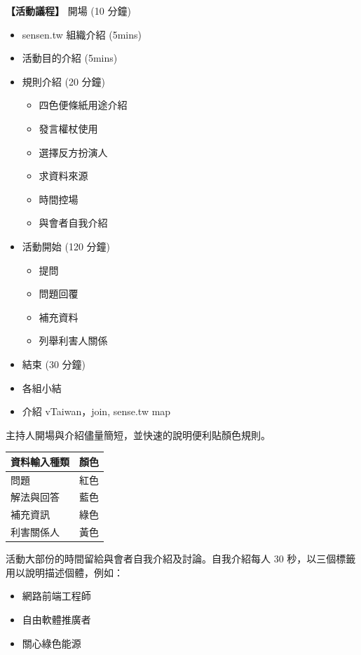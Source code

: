 \documentclass[12pt,a4paper]{article}
\begin{document}
\begin{enumerate}
\begin{enumerate}
\textbf{【活動議程】}
開場 (10 分鐘)
\begin{itemize}
\item sensen.tw 組織介紹 (5mins)
\item 活動目的介紹 (5mins)
\item 規則介紹 (20 分鐘)
\begin{itemize}
\item 四色便條紙用途介紹
\item 發言權杖使用
\item 選擇反方扮演人
\item 求資料來源
\item 時間控場
\item 與會者自我介紹
\end{itemize}
\item 活動開始 (120 分鐘)
\begin{itemize}
\item 提問
\item 問題回覆
\item 補充資料
\item 列舉利害人關係
\end{itemize}
\item 結束 (30 分鐘)
\item 各組小結
\item 介紹 vTaiwan，join, sense.tw map
\end{itemize}

主持人開場與介紹儘量簡短，並快速的說明便利貼顏色規則。

\begin{center}
\label{tbl:map-data-input-filter}
\begin{tabular}{l|l}
\toprule
資料輸入種類 & 顏色\\
\midrule
問題 & 紅色\\
解法與回答 & 藍色\\
補充資訊 & 綠色\\
利害關係人 & 黃色\\
\bottomrule
\end{tabular}
\end{center}

活動大部份的時間留給與會者自我介紹及討論。自我介紹每人 30 秒，以三個標籤用以說明描述個體，例如：

\begin{itemize}
\item 網路前端工程師
\item 自由軟體推廣者
\item 關心綠色能源
\end{itemize}


\end{enumerate}
\end{enumerate}
\end{document}
